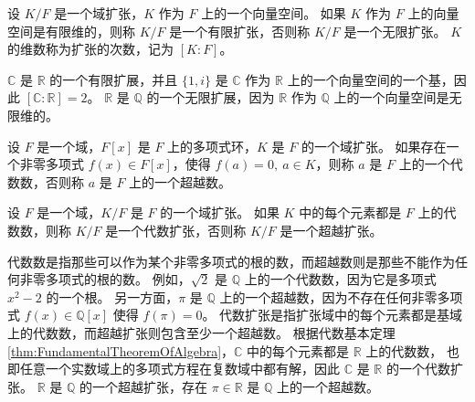 \begin{definition}
    设 $K/F$ 是一个域扩张，$K$ 作为 $F$ 上的一个向量空间。
    如果 $K$ 作为 $F$ 上的向量空间是有限维的，则称 $K/F$ 是一个有限扩张，否则称 $K/F$ 是一个无限扩张。
    $K$ 的维数称为扩张的次数，记为 $[K:F]$。
    \label{def:finite_infinite_extension}
\end{definition}

\begin{note}
    $\mathbb{C}$ 是 $\mathbb{R}$ 的一个有限扩展，并且 $\{1,i\}$ 是 $\mathbb{C}$ 作为 $\mathbb{R}$ 上的一个向量空间的一个基，因此 $[\mathbb{C}:\mathbb{R}]=2$。
    $\mathbb{R}$ 是 $\mathbb{Q}$ 的一个无限扩展，因为 $\mathbb{R}$ 作为 $\mathbb{Q}$ 上的一个向量空间是无限维的。
\end{note}
\vspace{1em}

\begin{definition}
    设 $F$ 是一个域，$F[x]$ 是 $F$ 上的多项式环，$K$ 是 $F$ 的一个域扩张。
    如果存在一个非零多项式 $f(x)\in F[x]$，使得 $f(a)=0,\ a\in K$，则称 $a$ 是 $F$ 上的一个代数数，否则称 $a$ 是 $F$ 上的一个超越数。
    \label{def:algebraic_transcendental}
\end{definition}

\begin{definition}
    设 $F$ 是一个域，$K/F$ 是 $F$ 的一个域扩张。
    如果 $K$ 中的每个元素都是 $F$ 上的代数数，则称 $K/F$ 是一个代数扩张，否则称 $K/F$ 是一个超越扩张。
    \label{def:algebraic_transcendental_extension}
\end{definition}

\begin{note}
    代数数是指那些可以作为某个非零多项式的根的数，而超越数则是那些不能作为任何非零多项式的根的数。
    例如，$\sqrt{2}$ 是 $\mathbb{Q}$ 上的一个代数数，因为它是多项式 $x^2 - 2$ 的一个根。
    另一方面，$\pi$ 是 $\mathbb{Q}$ 上的一个超越数，因为不存在任何非零多项式 $f(x)\in \mathbb{Q}[x]$ 使得 $f(\pi)=0$。
    代数扩张是指扩张域中的每个元素都是基域上的代数数，而超越扩张则包含至少一个超越数。
    根据代数基本定理 \ref{thm:FundamentalTheoremOfAlgebra}，$\mathbb{C}$ 中的每个元素都是 $\mathbb{R}$ 上的代数数，
    也即任意一个实数域上的多项式方程在复数域中都有解，因此 $\mathbb{C}$ 是 $\mathbb{R}$ 的一个代数扩张。
    $\mathbb{R}$ 是 $\mathbb{Q}$ 的一个超越扩张，存在 $\pi\in \mathbb{R}$ 是 $\mathbb{Q}$ 上的一个超越数。
\end{note}
\vspace{1em}

